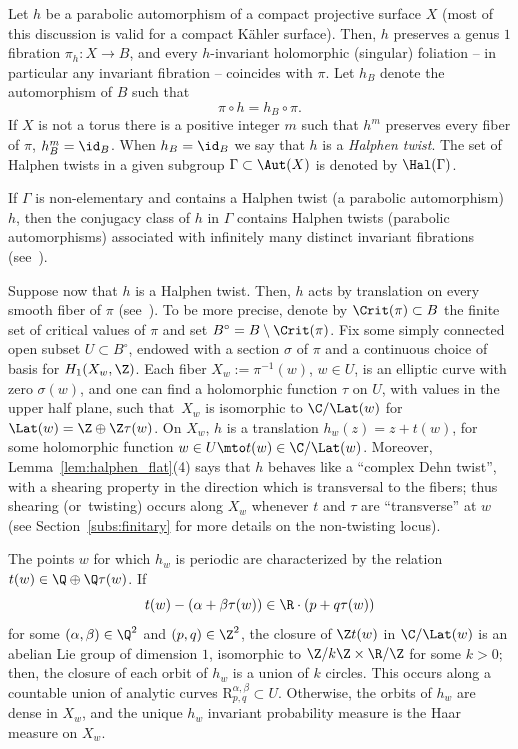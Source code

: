 Let $h$ be a parabolic automorphism of a compact projective surface $X$ (most of this discussion is valid for a
compact Kähler surface). Then, $h$ preserves a genus $1$ fibration
$\pi_h\colon X\to B$, and every $h$-invariant holomorphic (singular) foliation -- in particular any invariant fibration -- coincides with $\pi$. Let $h_B$ denote the automorphism of $B$ such that
\begin{equation*}
\pi\circ h=h_B\circ \pi.
\end{equation*}
If $X$ is not a torus there is a positive integer $m$ such that $h^m$ preserves every fiber of $\pi$, \ie $h_B^m=\id_B$. When $h_B = \id_B$ we say that $h$ is a \emph{Halphen twist}. The set of Halphen twists in a given subgroup $\Gamma\subset \Aut(X)$ is denoted by $\Hal(\Gamma)$.

\begin{rem}\label{rem:many_parabolic}
If $\Gamma$ is non-elementary and contains a Halphen twist (\resp a parabolic automorphism) $h$, then the conjugacy class of $h$ in $\Gamma$ contains Halphen twists (\resp parabolic automorphisms) associated with infinitely many distinct invariant fibrations (see~\cite[\S 3.1]{finite_orbits}).
\end{rem}

Suppose now that $h$ is a Halphen twist.
Then, $h$ acts by translation on every smooth fiber of $\pi$ (see~\cite[\S 3]{invariant}).
To be more precise, denote by $\Crit(\pi)\subset B$ the finite set of critical values of $\pi$ and set $B^\circ= B\setminus \Crit(\pi)$.
Fix some simply connected open subset $U\subset B^\circ$, endowed with a section $\sigma$ of
$\pi$ and a continuous choice of basis for $H_1(X_w, \Z)$.
Each fiber $X_w:=\pi^{-1}(w)$, $w\in U$, is an elliptic curve with zero $\sigma(w)$, and one can find a holomorphic function $\tau$ on $U$, with values in the upper half plane, such that~$X_w$ is isomorphic to $\C/\Lat(w)$ for $\Lat(w)=\Z\oplus \Z\tau(w)$. On $X_w$, $h$ is a translation $h_w(z)=z+t(w)$, for some holomorphic function $w\in U\mto t(w)\in \C/\Lat(w)$. Moreover, Lemma~\ref{lem:halphen_flat}(4) says that $h$ behaves like a ``complex Dehn twist'', with a shearing property in the direction which is transversal to the fibers; thus shearing (or~twisting) occurs along $X_w$ whenever $t$ and $\tau$ are ``transverse'' at $w$
(see Section~\ref{subs:finitary} for more details on the non-twisting locus).

The points $w$ for which $h_w$ is periodic are characterized by the relation $t(w)\in \Q\oplus \Q\tau(w)$. If
\begin{equation*}
t(w)-(\alpha+\beta\tau(w))\in \R \cdot (p+q\tau(w))
\end{equation*}
for some $(\alpha,\beta)\in \Q^2$ and $(p,q)\in \Z^2$, the closure of $\Z t(w)$ in $\C/\Lat(w)$ is an abelian Lie group of dimension $1$,
isomorphic to $\Z / k\Z \times \R /\Z$ for some $k>0$; then, the closure of each orbit of $h_w$ is a union of $k$ circles. This occurs along a countable union of analytic curves $\mathrm{R}^{\alpha, \beta}_{p, q}\subset U$. Otherwise, the orbits of $h_w$ are dense in $X_w$, and the unique $h_w$ invariant probability
measure is the Haar measure on $X_w$.

